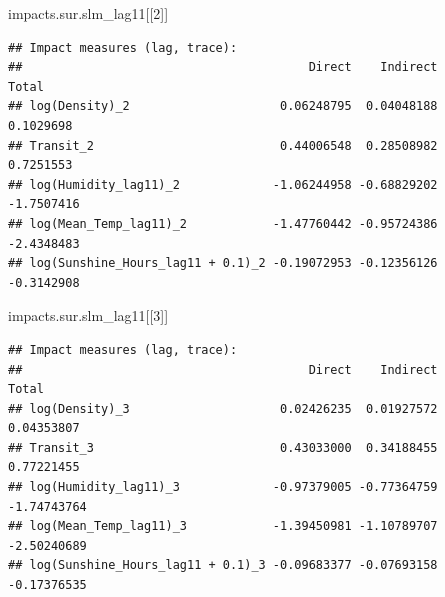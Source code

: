 \documentclass[]{elsarticle} %
\newenvironment{Shaded}{\begin{snugshade}}{\end{snugshade}}
\newcommand{\ControlFlowTok}[1]{\textcolor[rgb]{0.13,0.29,0.53}{\textbf{#1}}}
\newcommand{\DataTypeTok}[1]{\textcolor[rgb]{0.13,0.29,0.53}{#1}}
\newcommand{\DecValTok}[1]{\textcolor[rgb]{0.00,0.00,0.81}{#1}}
\newcommand{\KeywordTok}[1]{\textcolor[rgb]{0.13,0.29,0.53}{\textbf{#1}}}
\newcommand{\NormalTok}[1]{#1}
\newcommand{\OperatorTok}[1]{\textcolor[rgb]{0.81,0.36,0.00}{\textbf{#1}}}
\newcommand{\StringTok}[1]{\textcolor[rgb]{0.31,0.60,0.02}{#1}}
\begin{document}
\begin{Shaded}
\begin{Highlighting}[]
\NormalTok{impacts.sur.slm_lag11[[}\DecValTok{2}\NormalTok{]]}
\end{Highlighting}
\end{Shaded}

\begin{verbatim}
## Impact measures (lag, trace):
##                                        Direct    Indirect      Total
## log(Density)_2                     0.06248795  0.04048188  0.1029698
## Transit_2                          0.44006548  0.28508982  0.7251553
## log(Humidity_lag11)_2             -1.06244958 -0.68829202 -1.7507416
## log(Mean_Temp_lag11)_2            -1.47760442 -0.95724386 -2.4348483
## log(Sunshine_Hours_lag11 + 0.1)_2 -0.19072953 -0.12356126 -0.3142908
\end{verbatim}

\begin{Shaded}
\begin{Highlighting}[]
\NormalTok{impacts.sur.slm_lag11[[}\DecValTok{3}\NormalTok{]]}
\end{Highlighting}
\end{Shaded}

\begin{verbatim}
## Impact measures (lag, trace):
##                                        Direct    Indirect       Total
## log(Density)_3                     0.02426235  0.01927572  0.04353807
## Transit_3                          0.43033000  0.34188455  0.77221455
## log(Humidity_lag11)_3             -0.97379005 -0.77364759 -1.74743764
## log(Mean_Temp_lag11)_3            -1.39450981 -1.10789707 -2.50240689
## log(Sunshine_Hours_lag11 + 0.1)_3 -0.09683377 -0.07693158 -0.17376535
\end{verbatim}

\begin{Shaded}
\end{Shaded}
\end{document}
